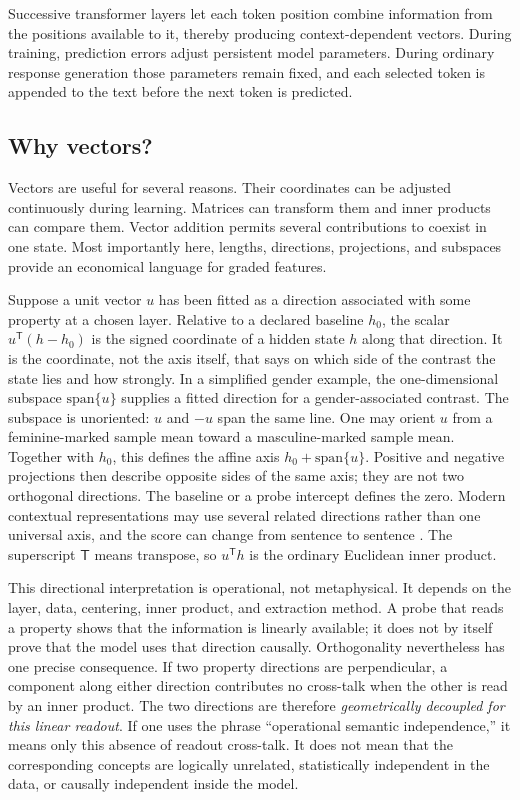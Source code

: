 \documentclass[
  aps,
  reprint,
  superscriptaddress,
  floatfix,
  nofootinbib,
  longbibliography
]{revtex4-2}
\newcommand{\T}{^{\mathsf T}}
\begin{document}
Successive transformer layers let each token position combine information from
the positions available to it, thereby producing context-dependent vectors.
During training, prediction errors adjust persistent model parameters.  During
ordinary response generation those parameters remain fixed, and each selected
token is appended to the text before the next token is predicted.

\subsection{Why vectors?}

Vectors are useful for several reasons.  Their coordinates can be adjusted
continuously during learning.  Matrices can transform them and inner products
can compare them.  Vector addition permits several contributions to coexist
in one state.  Most importantly here, lengths, directions, projections, and
subspaces provide an economical language for graded features.

Suppose a unit vector $u$ has been fitted as a direction associated with some
property at a chosen layer.  Relative to a declared baseline $h_0$, the scalar
$u\T(h-h_0)$ is the signed coordinate of a hidden state $h$ along that
direction.  It is the coordinate, not the axis itself, that says on which side
of the contrast the state lies and how strongly.  In a simplified gender
example, the one-dimensional subspace $\mathrm{span}\{u\}$ supplies a fitted
direction for a gender-associated contrast.  The subspace is unoriented:
$u$ and $-u$ span the same line.  One may orient $u$ from a feminine-marked
sample mean toward a masculine-marked sample mean.  Together with $h_0$, this
defines the affine axis $h_0+\mathrm{span}\{u\}$.  Positive and negative projections then
describe opposite sides of the same axis; they are not two orthogonal
directions.  The baseline or a probe intercept defines the zero.  Modern
contextual representations may use several related directions rather than one
universal axis, and the score can change from sentence to sentence
\cite{bolukbasi2016gender,zhao2019contextualgender}.  The superscript
$\mathsf T$ means transpose, so $u\T h$ is the ordinary Euclidean inner
product.

This directional interpretation is operational, not metaphysical.  It depends
on the layer, data, centering, inner product, and extraction method.  A probe
that reads a property shows that the information is linearly available; it
does not by itself prove that the model uses that direction causally.
Orthogonality nevertheless has one precise consequence.  If two property
directions are perpendicular, a component along either direction contributes
no cross-talk when the other is read by an inner product.  The two directions
are therefore \emph{geometrically decoupled for this linear readout}.  If one
uses the phrase ``operational semantic independence,'' it means only this
absence of readout cross-talk.  It does not mean that the corresponding concepts are
logically unrelated, statistically independent in the data, or causally
independent inside the model.
\end{document}
